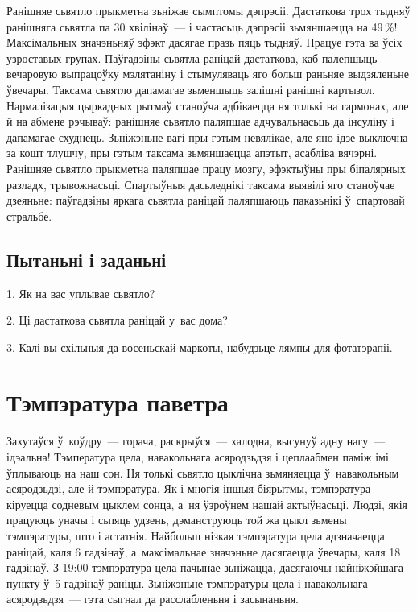 Ранішняе сьвятло прыкметна зьніжае сымптомы дэпрэсіі. Дастаткова трох тыдняў ранішняга сьвятла па 30 хвілінаў~--- і частасьць дэпрэсіі зьмяншаецца на 49\,\%! Максімальных значэньняў эфэкт дасягае празь пяць тыдняў. Працуе гэта ва ўсіх узроставых групах. Паўгадзіны сьвятла раніцай дастаткова, каб палепшыць вечаровую выпрацоўку мэлятаніну і стымуляваць яго больш раньняе выдзяленьне ўвечары. Таксама сьвятло дапамагае зьменшыць залішні ранішні картызол. Нармалізацыя цыркадных рытмаў станоўча адбіваецца ня толькі на гармонах, але й на абмене рэчываў: ранішняе сьвятло паляпшае адчувальнасьць да інсуліну і дапамагае схуднець. Зьніжэньне вагі пры гэтым невялікае, але яно ідзе выключна за кошт тлушчу, пры гэтым таксама зьмяншаецца апэтыт, асабліва вячэрні. Ранішняе сьвятло прыкметна паляпшае працу мозгу, эфэктыўны пры біпалярных разладх, трывожнасьці. Спартыўныя дасьледнікі таксама выявілі яго станоўчае дзеяньне: паўгадзіны яркага сьвятла раніцай паляпшаюць паказьнікі ў~спартовай стральбе.

\subsection*{Пытаньні і заданьні}

1. Як на вас уплывае сьвятло?

2. Ці дастаткова сьвятла раніцай у~вас дома?

3. Калі вы схільныя да восеньскай маркоты, набудзьце лямпы для фотатэрапіі.


\section{Тэмпэратура паветра}

Захутаўся ў~коўдру~--- горача, раскрыўся~--- халодна, высунуў адну нагу~--- ідэальна! Тэмпература цела, навакольнага асяродзьдзя і цеплаабмен паміж імі ўплываюць на наш сон. Ня толькі сьвятло цыклічна зьмяняецца ў~навакольным асяродзьдзі, але й тэмпэратура. Як і многія іншыя біярытмы, тэмпэратура кіруецца содневым цыклем сонца, а~ня ўзроўнем нашай актыўнасьці. Людзі, якія працуюць уначы і сьпяць удзень, дэманструюць той жа цыкл зьмены тэмпэратуры, што і астатнія. Найбольш нізкая тэмпэратура цела адзначаецца раніцай, каля 6 гадзінаў, а~максімальнае значэньне дасягаецца ўвечары, каля 18 гадзінаў. З 19:00 тэмпэратура цела пачынае зьніжацца, дасягаючы найніжэйшага пункту ў~5 гадзінаў раніцы. Зьніжэньне тэмпэратуры цела і навакольнага асяродзьдзя~--- гэта сыгнал да расслабленьня і засынаньня.

